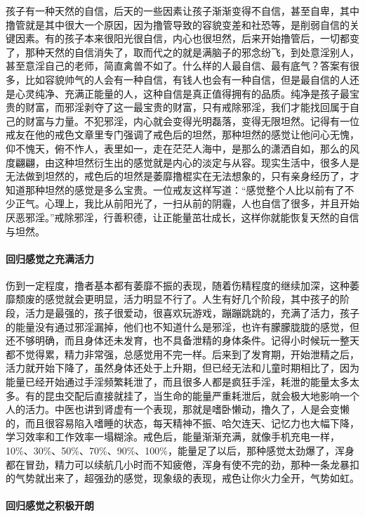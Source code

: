孩子有一种天然的自信，后天的一些因素让孩子渐渐变得不自信，甚至自卑，其中撸管就是其中很大一个原因，因为撸管导致的容貌变差和社恐等，是削弱自信的关键因素。有的孩子本来很阳光很自信，内心也很坦然，后来开始撸管后，一切都变了，那种天然的自信消失了，取而代之的就是满脑子的邪念纷飞，到处意淫别人，甚至意淫自己的老师，简直禽兽不如了。什么样的人最自信、最有底气？答案有很多，比如容貌帅气的人会有一种自信，有钱人也会有一种自信，但是最自信的人还是心灵纯净、充满正能量的人，这种自信是真正值得拥有的品质。纯净是孩子最宝贵的财富，而邪淫剥夺了这一最宝贵的财富，只有戒除邪淫，我们才能找回属于自己的财富与力量。不犯邪淫，内心就会变得光明磊落，变得无限坦然。记得有一位戒友在他的戒色文章里专门强调了戒色后的坦然，那种坦然的感觉让他问心无愧，仰不愧天，俯不怍人，表里如一，走在茫茫人海中，是那么的潇洒自如，那么的风度翩翩，由这种坦然衍生出的感觉就是内心的淡定与从容。现实生活中，很多人是无法做到坦然的，戒色后的坦然是萎靡撸棍实在无法想象的，只有亲身经历了，才知道那种坦然的感觉是多么宝贵。一位戒友这样写道：“感觉整个人比以前有了不少正气。心理上，我比从前阳光了，一扫从前的阴霾，人也自信了很多，并且开始厌恶邪淫。”戒除邪淫，行善积德，让正能量茁壮成长，这样你就能恢复天然的自信与坦然。

\paragraph{回归感觉之充满活力}

伤到一定程度，撸者基本都有萎靡不振的表现，随着伤精程度的继续加深，这种萎靡颓废的感觉就会更明显，活力明显不行了。人生有好几个阶段，其中孩子的阶段，活力是最强的，孩子很爱动，很喜欢玩游戏，蹦蹦跳跳的，充满了活力，孩子的能量没有通过邪淫漏掉，他们也不知道什么是邪淫，也许有朦朦胧胧的感觉，但还不够明确，而且身体还未发育，也不具备泄精的身体条件。记得小时候玩一整天都不觉得累，精力非常强，总感觉用不完一样。后来到了发育期，开始泄精之后，活力就开始下降了，虽然身体还处于上升期，但已经无法和儿童时期相比了，因为能量已经开始通过手淫频繁耗泄了，而且很多人都是疯狂手淫，耗泄的能量太多太多。有的昆虫交配后直接就挂了，当生命的能量严重耗泄后，就会极大地影响一个人的活力。中医也讲到肾虚有一个表现，那就是嗜卧懒动，撸久了，人是会变懒的，而且很容易陷入嗜睡的状态，每天精神不振、哈欠连天、记忆力也大幅下降，学习效率和工作效率一塌糊涂。戒色后，能量渐渐充满，就像手机充电一样，10\%、30\%、50\%、70\%、90\%、100\%，能量足了以后，那种感觉太劲爆了，浑身都在冒劲，精力可以续航几小时而不知疲倦，浑身有使不完的劲，那种一条龙暴扣的气势就出来了，超强劲的感觉，现象级的表现，戒色让你火力全开，气势如虹。

\paragraph{回归感觉之积极开朗}

